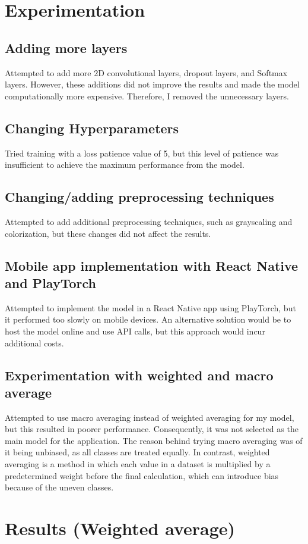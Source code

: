 \documentclass[a4paper,oneside,11pt]{book}
\begin{document}
\chapter{Experimentation}
\section{Adding more layers}
Attempted to add more 2D convolutional layers, dropout layers, and Softmax layers. However, these additions did not improve the results and made the model computationally more expensive. Therefore, I removed the unnecessary layers.
\section{Changing Hyperparameters}
Tried training with a loss patience value of 5, but this level of patience was insufficient to achieve the maximum performance from the model.
\section{Changing/adding preprocessing techniques}
Attempted to add additional preprocessing techniques, such as grayscaling and colorization, but these changes did not affect the results.
\section{Mobile app implementation with React Native and PlayTorch}
Attempted to implement the model in a React Native app using PlayTorch, but it performed too slowly on mobile devices. An alternative solution would be to host the model online and use API calls, but this approach would incur additional costs.
\section{Experimentation with weighted and macro average}
Attempted to use macro averaging instead of weighted averaging for my model, but this resulted in poorer performance. Consequently, it was not selected as the main model for the application. The reason behind trying macro averaging was of it being unbiased, as all classes are treated equally. In contrast, weighted averaging is a method in which each value in a dataset is multiplied by a predetermined weight before the final calculation, which can introduce bias because of the uneven classes.
\chapter{Results (Weighted average)}
\end{document}
